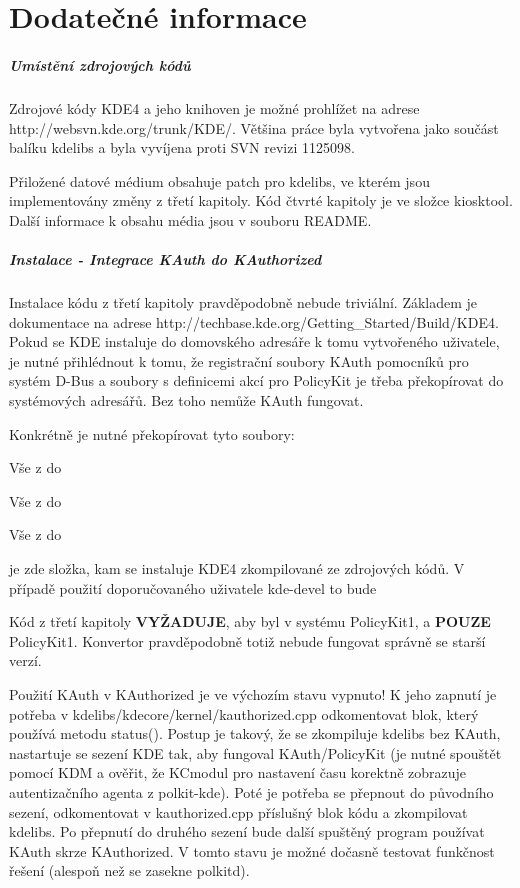 \chapter{Dodatečné informace}
\paragraph{Umístění zdrojových kódů}
Zdrojové kódy KDE4 a jeho knihoven je možné prohlížet na adrese http://websvn.kde.org/trunk/KDE/. Většina práce byla vytvořena jako součást balíku kdelibs a byla vyvíjena proti SVN revizi 1125098.

Přiložené datové médium obsahuje patch pro kdelibs, ve kterém jsou implementovány změny z třetí kapitoly.
Kód čtvrté kapitoly je ve složce kiosktool.
Další informace k obsahu média jsou v souboru README.

\paragraph{Instalace - Integrace KAuth do KAuthorized}
Instalace kódu z třetí kapitoly pravděpodobně nebude triviální. Základem je dokumentace na adrese http://techbase.kde.org/Getting\_Started/Build/KDE4. Pokud se KDE instaluje do domovského adresáře k tomu vytvořeného uživatele, je nutné přihlédnout k tomu, že registrační soubory KAuth pomocníků pro systém D-Bus a soubory s definicemi akcí pro PolicyKit je třeba překopírovat do systémových adresářů. Bez toho nemůže KAuth fungovat.

\noindent
Konkrétně je nutné překopírovat tyto soubory:

\noindent
Vše z  do 

\noindent
Vše z  do 

\noindent
Vše z  do 

\noindent
{} je zde složka, kam se instaluje KDE4 zkompilované ze zdrojových kódů. V případě použití doporučovaného uživatele kde-devel to bude 

Kód z třetí kapitoly \textbf{VYŽADUJE}, aby byl v systému PolicyKit1, a \textbf{POUZE} PolicyKit1. Konvertor pravděpodobně totiž nebude fungovat správně se starší verzí.

Použití KAuth v KAuthorized je ve výchozím stavu vypnuto! K jeho zapnutí je potřeba v kdelibs/kdecore/kernel/kauthorized.cpp odkomentovat blok, který používá metodu status(). Postup je takový, že se zkompiluje kdelibs bez KAuth, nastartuje se sezení KDE tak, aby fungoval KAuth/PolicyKit (je nutné spouštět pomocí KDM a ověřit, že KCmodul pro nastavení času korektně zobrazuje autentizačního agenta z polkit-kde). Poté je potřeba se přepnout do původního sezení, odkomentovat v kauthorized.cpp příslušný blok kódu a zkompilovat kdelibs. Po přepnutí do druhého sezení bude další spuštěný program používat KAuth skrze KAuthorized. V tomto stavu je možné dočasně testovat funkčnost řešení (alespoň než se zasekne polkitd).

